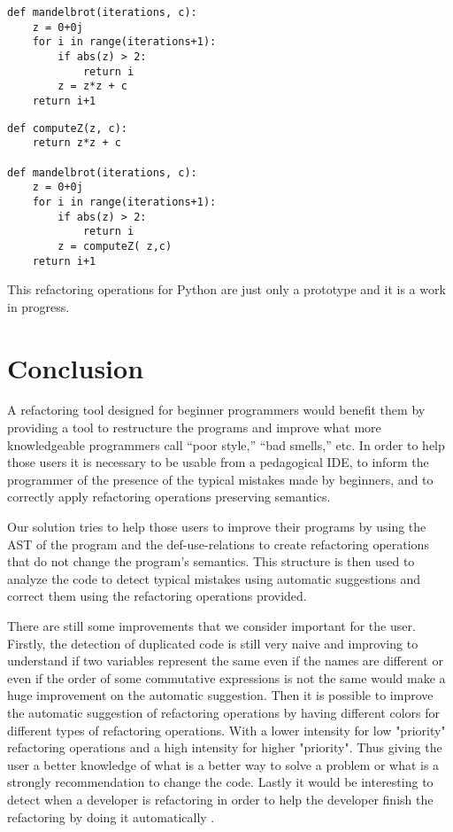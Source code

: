 \begin{lstlisting}
def mandelbrot(iterations, c):
    z = 0+0j
    for i in range(iterations+1):
        if abs(z) > 2:
            return i
        z = z*z + c
    return i+1
\end{lstlisting}

\begin{lstlisting}
def computeZ(z, c):
    return z*z + c

def mandelbrot(iterations, c):
    z = 0+0j
    for i in range(iterations+1):
        if abs(z) > 2:
            return i
        z = computeZ( z,c)
    return i+1
\end{lstlisting}

This refactoring operations for Python are just only a prototype and it is a work
in progress.
\section{Conclusion}
A refactoring tool designed for beginner programmers would benefit them
by providing a tool to restructure the programs and improve what more knowledgeable programmers call ``poor style,''
``bad smells,'' etc.
In order to help those users it is necessary to be usable from a pedagogical IDE,
to inform the programmer of the presence of the typical mistakes made by beginners, and
to correctly apply refactoring operations preserving semantics.

Our solution tries to help those users to improve their programs by using the AST of
the program and the def-use-relations to create refactoring operations that do not
change the program's semantics. This structure is then used to analyze the code
to detect typical mistakes using automatic suggestions and correct them using the
refactoring operations provided.


There are still some improvements that we consider important for the user.
Firstly, the detection of duplicated code is still very naive and improving to understand if
two variables represent the same even if the names are different or even if the
 order of some commutative expressions is not the same would make a huge improvement
 on the automatic suggestion.
Then it is possible to improve the automatic suggestion of refactoring operations by
having different colors for different types of refactoring operations.
With a lower intensity for low "priority" refactoring operations and a high intensity
for higher "priority". Thus giving the user a better knowledge of what is a better
way to solve a problem or what is a strongly recommendation to change the code.
Lastly it would be interesting to detect when a developer is refactoring in order to help the developer finish the
refactoring by doing it automatically \cite{ge2012reconciling}.
